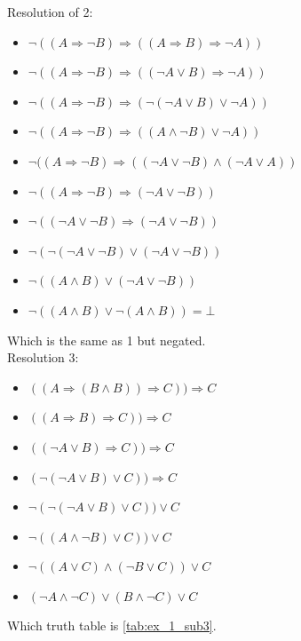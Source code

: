 \documentclass[10pt,a4paper]{article}
\begin{document}
\begin{itemize}
Resolution of 2:
\begin{itemize}
\item $\neg ((A\Rightarrow \neg B)\Rightarrow ((A\Rightarrow B)\Rightarrow \neg A))$
\item $\neg ((A\Rightarrow \neg B)\Rightarrow ((\neg A\vee B)\Rightarrow \neg A))$
\item $\neg ((A\Rightarrow \neg B)\Rightarrow (\neg (\neg A\vee B)\vee \neg A))$
\item $\neg ((A\Rightarrow \neg B)\Rightarrow ( ( A\wedge \neg B)\vee \neg A))$
\item $\neg ((A\Rightarrow \neg B)\Rightarrow (  (\neg A \vee \neg B) \wedge (\neg A \vee A))$
\item $\neg ((A\Rightarrow \neg B)\Rightarrow (\neg A \vee \neg B))$
\item $\neg ((\neg A\vee \neg B)\Rightarrow (\neg A \vee \neg B))$
\item $\neg (\neg (\neg A\vee \neg B)\vee (\neg A \vee \neg B))$
\item $\neg ( ( A\wedge  B)\vee (\neg A \vee \neg B))$
\item $\neg ( ( A\wedge  B)\vee \neg ( A \wedge B))=\bot$
\end{itemize}
Which is the same as 1 but negated.\\

Resolution 3:
\begin{itemize}
\item $((A\Rightarrow (B\wedge B))\Rightarrow C))\Rightarrow C$
\item $((A\Rightarrow  B)\Rightarrow C))\Rightarrow C$
\item $((\neg A\vee  B)\Rightarrow C))\Rightarrow C$
\item $(\neg (\neg A\vee  B)\vee C))\Rightarrow C$
\item $\neg (\neg (\neg A\vee  B)\vee C))\vee C$
\item $\neg ( ( A\wedge  \neg B)\vee C))\vee C$
\item $\neg ( ( A \vee C) \wedge( \neg B \vee C))\vee C$
\item $( \neg A \wedge \neg C) \vee  (  B \wedge \neg C) \vee C$

\end{itemize}
Which truth table is \ref{tab:ex_1_sub3}.
\begin{table}[H]
\parbox{.5\linewidth}{

}
\end{table}
\end{itemize}
\end{document}
